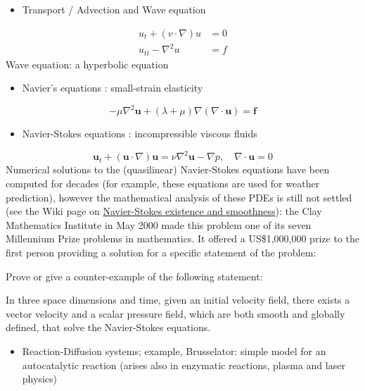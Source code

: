 \documentclass[12pt,a4paper]{article}
\begin{document}
\begin{itemize}
\item Transport / Advection and Wave equation 

\end{itemize}

\begin{align*}
    u_t + (v \cdot \nabla) u &= 0 \\
  u_{tt} - \nabla^2 u &= f 
\end{align*}
Wave equation: a hyperbolic equation

\begin{itemize}
\item Navier's equations : small-strain elasticity 

\end{itemize}
\[
- \mu \nabla^2 \mathbf{u} + (\lambda+\mu) \nabla  (\nabla\cdot\mathbf{u}) = \mathbf{f}
\]
\begin{itemize}
\item Navier-Stokes equations : incompressible viscous fluids 

\end{itemize}
\[
\mathbf{u}_t + (\mathbf{u} \cdot \nabla)\mathbf{u} = \nu \nabla^2 \mathbf{u} - \nabla p, \quad \nabla \cdot \mathbf{u} = 0
\]
Numerical solutions to the (quasilinear) Navier-Stokes equations have been computed for decades (for example, these equations are used for weather prediction), however the mathematical analysis of these PDEs is still not settled (see the Wiki page on \href{https://en.wikipedia.org/wiki/Navier%E2%80%93Stokes_existence_and_smoothness}{Navier-Stokes existence and smoothness}): the Clay Mathematics Institute in May 2000 made this problem one of its seven Millennium Prize problems in mathematics. It offered a US\$1,000,000 prize to the first person providing a solution for a specific statement of the problem:

Prove or give a counter-example of the following statement:

In three space dimensions and time, given an initial velocity field, there exists a vector velocity and a scalar pressure field, which are both smooth and globally defined, that solve the Navier-Stokes equations.

\begin{itemize}
\item Reaction-Diffusion systems; example, Brusselator: simple model for an autocatalytic reaction (arises also in enzymatic reactions, plasma and laser physics)

\end{itemize}
\end{document}
